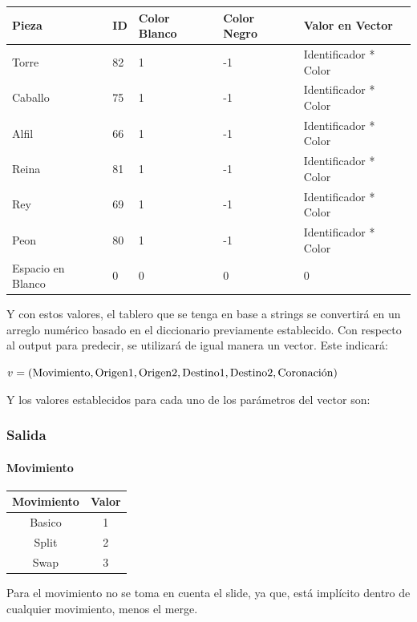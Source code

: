 {\footnotesize
\begin{tabular}{|m{1.5cm}|m{1cm}|m{1.2cm}|m{1cm}|m{2cm}|}
\hline
\textbf{Pieza} & \textbf{ID} & \textbf{Color Blanco} & \textbf{Color Negro} & \textbf{Valor en Vector} \\ \hline
Torre & 82 & 1 & -1 &  Identificador * Color \\ \hline
Caballo & 75 & 1 & -1 & Identificador * Color \\ \hline
Alfil & 66 & 1 & -1 &  Identificador * Color \\ \hline
Reina & 81 & 1 & -1 &  Identificador * Color \\ \hline
Rey & 69 & 1 & -1 & Identificador * Color \\ \hline
Peon & 80 & 1 & -1 & Identificador * Color \\ \hline
Espacio en Blanco & 0 & 0 & 0 & 0 \\ \hline
\end{tabular}
}\newline

Y con estos valores, el tablero que se tenga en base a strings se convertirá en un arreglo numérico basado en el diccionario previamente establecido.\newline
Con respecto al output para predecir, se utilizará de igual manera un vector. Este indicará:

$v = (\text{Movimiento}, \text{Origen} 1, \text{Origen} 2, \text{Destino} 1, \text{Destino} 2,\newline \text{Coronación})$

Y los valores establecidos para cada uno de los parámetros del vector son:

\subsubsection{Salida}
\paragraph{Movimiento}
\begin{center}
\begin{tabular}{|c|c|}
\hline
\textbf{Movimiento} & \textbf{Valor} \\ \hline
Basico & 1\\ \hline
Split  & 2 \\\hline
Swap   & 3 \\\hline
\end{tabular}
\end{center}
Para el movimiento no se toma en cuenta el slide, ya que, está implícito dentro de cualquier movimiento, menos el merge.

